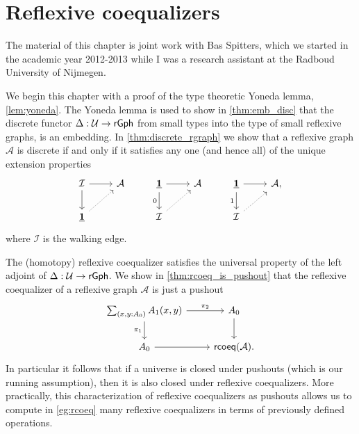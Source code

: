 \chapter{Reflexive coequalizers}\label{chap:rcoeq}

The material of this chapter is joint work with Bas Spitters, which we started in the academic year 2012-2013 while I was a research assistant at the Radboud University of Nijmegen.

We begin this chapter with a proof of the type theoretic Yoneda lemma, \cref{lem:yoneda}. The Yoneda lemma is used to show in \cref{thm:emb_disc} that the discrete functor $\Delta:\mathcal{U}\to\mathsf{rGph}$ from small types into the type of small reflexive graphs, is an embedding. In \cref{thm:discrete_rgraph} we show that a reflexive graph $\mathcal{A}$ is discrete if and only if it satisfies any one (and hence all) of the unique extension properties
\begin{equation*}
\begin{tikzcd}
\mathcal{I} \arrow[r] \arrow[d] & \mathcal{A} & \unit \arrow[d,swap,"0"] \arrow[r] & \mathcal{A} & \unit \arrow[d,swap,"1"] \arrow[r] & \mathcal{A}, \\
\unit \arrow[ur,densely dotted] & & \mathcal{I} \arrow[ur,densely dotted] & & \mathcal{I} \arrow[ur,densely dotted]
\end{tikzcd}
\end{equation*}
where $\mathcal{I}$ is the walking edge. 

The (homotopy) reflexive coequalizer satisfies the universal property of the left adjoint of $\Delta:\mathcal{U}\to\mathsf{rGph}$. We show in \cref{thm:rcoeq_is_pushout} that the reflexive coequalizer of a reflexive graph $\mathcal{A}$ is just a pushout
\begin{equation*}
\begin{tikzcd}
\sm{x,y:\pts{A}}\edg{A}(x,y) \arrow[r,"\pi_2"] \arrow[d,swap,"\pi_1"] & \pts{A} \arrow[d] \\
\pts{A} \arrow[r] & \mathsf{rcoeq}(\mathcal{A}).
\end{tikzcd}
\end{equation*}
In particular it follows that if a universe is closed under pushouts (which is our running assumption), then it is also closed under reflexive coequalizers. More practically, this characterization of reflexive coequalizers as pushouts allows us to compute in \cref{eg:rcoeq} many reflexive coequalizers in terms of previously defined operations.

